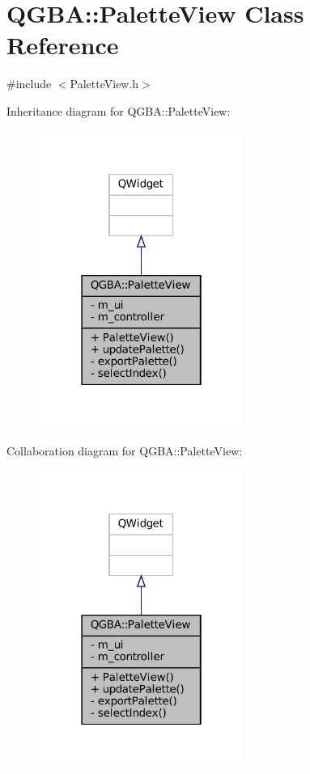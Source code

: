 \hypertarget{class_q_g_b_a_1_1_palette_view}{}\section{Q\+G\+BA\+:\+:Palette\+View Class Reference}
\label{class_q_g_b_a_1_1_palette_view}


{\ttfamily \#include $<$Palette\+View.\+h$>$}



Inheritance diagram for Q\+G\+BA\+:\+:Palette\+View\+:
\nopagebreak
\begin{figure}[H]
\begin{center}
\leavevmode
\includegraphics[width=190pt]{class_q_g_b_a_1_1_palette_view__inherit__graph}
\end{center}
\end{figure}


Collaboration diagram for Q\+G\+BA\+:\+:Palette\+View\+:
\nopagebreak
\begin{figure}[H]
\begin{center}
\leavevmode
\includegraphics[width=190pt]{class_q_g_b_a_1_1_palette_view__coll__graph}
\end{center}
\end{figure}
